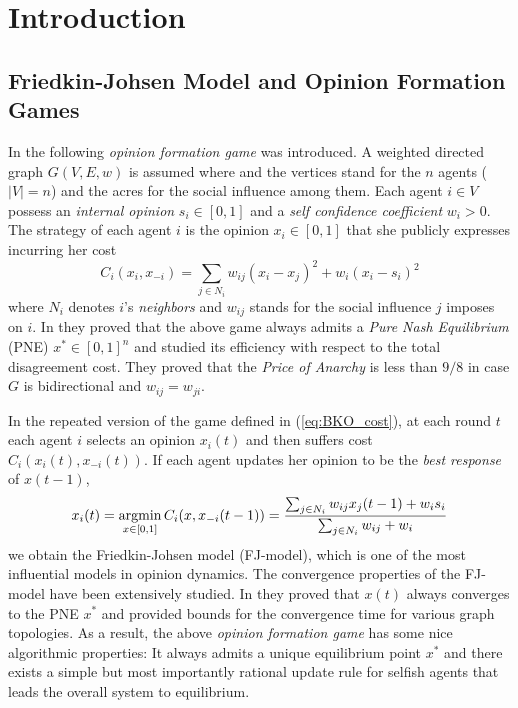 \section{Introduction}

\subsection{Friedkin-Johsen Model and Opinion Formation Games}
In \cite{BKO11} the following \emph{opinion formation game} was introduced.
A weighted directed graph $G(V,E,w)$ is assumed where and the vertices
stand for the $n$ agents ($|V| = n$) and the acres for the social
influence among them. Each agent $i \in V$ possess an
\emph{internal opinion} $s_i \in [0,1]$ and a \emph{self confidence coefficient}
$w_i>0$. The strategy of each agent $i$ is the opinion $x_i\in [0,1]$ that
she publicly expresses incurring her cost
%
\begin{equation}\label{eq:BKO_cost}
  C_i(x_i,x_{-i}) = \sum_{j \in N_i}w_{ij}(x_i-x_j)^2 + w_i(x_i -s_i)^2
\end{equation}
%
where $N_i$ denotes $i$'s \emph{neighbors} and $w_{ij}$ stands for
the social influence $j$ imposes on $i$. In \cite{BKO11} they proved that
the above game always admits a \emph{Pure Nash Equilibrium} (PNE) $x^* \in [0,1]^n$
and studied its efficiency with respect to the total disagreement cost.
They proved that the \emph{Price of Anarchy}
is less than $9/8$ in case $G$ is bidirectional and $w_{ij}=w_{ji}$.

In the repeated version of the game defined in (\ref{eq:BKO_cost}),
at each round $t$ each agent $i$ selects an opinion $x_i(t)$ and then suffers
cost $C_i(x_i(t),x_{-i}(t))$. If each agent updates her opinion to be the
\emph{best response} of $x(t-1)$,
%
\begin{equation}\label{eq:FJ_model}
  x_i(t) =
  \operatorname*{argmin}_{x \in [0,1]}C_i(x,x_{-i}(t-1))=
  \frac{\sum_{j \in N_i}w_{ij}x_j(t-1) + w_is_i}{\sum_{j \in N_i}w_{ij} + w_i}
\end{equation}
%
we obtain the Friedkin-Johsen model (FJ-model), which is one of
the most influential models in opinion dynamics.
The convergence properties of the FJ-model have been extensively studied.
In \cite{GS14} they proved that $x(t)$ always converges
to the PNE $x^*$ and provided bounds for the convergence time for various
graph topologies. As a result, the
above \emph{opinion formation game} has some nice algorithmic properties: It
always admits a unique equilibrium point $x^*$ and there
exists a simple but most importantly rational update rule for selfish agents
that leads the overall system to equilibrium.

